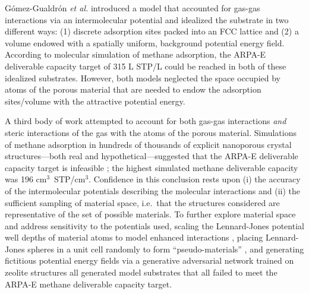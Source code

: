 G\'omez-Gualdr\'on \emph{et al.} \cite{gomez2017impact} introduced a model that accounted for gas-gas interactions via an intermolecular potential and idealized the substrate in two different ways: (1) discrete adsorption sites packed into an FCC lattice and (2) a volume endowed with a spatially uniform, background potential energy field. According to molecular simulation of methane adsorption, the ARPA-E deliverable capacity target of 315 L STP/L could be reached in both of these idealized substrates.
However, both models neglected the space occupied by atoms of the porous material that are needed to endow the adsorption sites/volume with the attractive potential energy. %

A third body of work attempted to account for both gas-gas interactions \emph{and} steric interactions of the gas with the atoms of the porous material.
Simulations of methane adsorption in hundreds of thousands of explicit nanoporous crystal structures---both real and hypothetical---suggested that the ARPA-E deliverable capacity target is infeasible \cite{simon2015materials}; the highest simulated methane deliverable capacity was 196 cm$^3$~STP/cm$^3$. Confidence in this conclusion rests upon (i) the accuracy of the intermolecular potentials describing the molecular interactions and (ii) the sufficient sampling of material space, i.e.\ that the structures considered are representative of the set of possible materials. To further explore material space and address sensitivity to the potentials used, scaling the Lennard-Jones potential well depths of material atoms to model enhanced interactions \cite{gomez2014exploring}, placing Lennard-Jones spheres in a unit cell randomly to form ``pseudo-materials'' \cite{kaija2018high}, and generating fictitious potential energy fields via a generative adversarial network trained on zeolite structures \cite{lee2019predicting} all generated model substrates that all failed to meet the ARPA-E methane deliverable capacity target.

